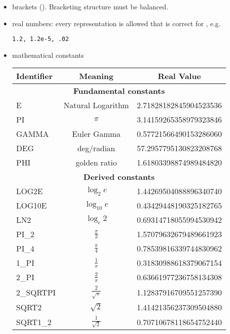\begin{itemize}
\item brackets {{{()}}}. Bracketing structure must be balanced.
\item real numbers: every representation is allowed that is correct for
, e.g.
\begin{lstlisting}[style=XMLStyle]
   1.2, 1.2e-5, .02
\end{lstlisting}
\item mathematical constants
\begin{center}
\begin{tabular}{lcc}
\toprule
Identifier & Meaning & Real Value \\
\midrule
\multicolumn{3}{c}{\textbf{Fundamental constants}} \\
E           & Natural Logarithm     & 2.71828182845904523536 \\
PI          & $\pi$                 & 3.14159265358979323846 \\
GAMMA       & Euler Gamma           & 0.57721566490153286060 \\
DEG         & deg/radian            & 57.2957795130823208768 \\
PHI         & golden ratio          & 1.61803398874989484820 \\
\multicolumn{3}{c}{\textbf{Derived constants}} \\
LOG2E       & $\log_2 e$            & 1.44269504088896340740 \\
LOG10E      & $\log_{10} e$         & 0.43429448190325182765 \\
LN2         & $\log_e 2$            & 0.69314718055994530942 \\
PI\_2       & $\frac{\pi}{2}$       & 1.57079632679489661923 \\
PI\_4       & $\frac{\pi}{4}$       & 0.78539816339744830962 \\
1\_PI       & $\frac{1}{\pi}$       & 0.31830988618379067154 \\
2\_PI       & $\frac{2}{\pi}$       & 0.63661977236758134308 \\
2\_SQRTPI   & $\frac{2}{\sqrt{\pi}}$& 1.12837916709551257390 \\
SQRT2       & $\sqrt{2}$            & 1.41421356237309504880 \\
SQRT1\_2    & $\frac{1}{\sqrt{2}}$  & 0.70710678118654752440 \\
\bottomrule
\end{tabular}
\end{center}


\end{itemize}
